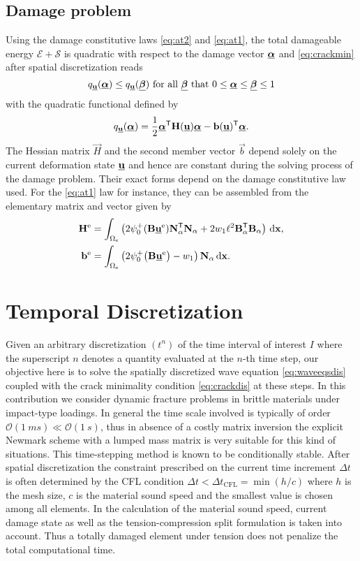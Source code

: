 \subsection{Damage problem}
Using the damage constitutive laws \eqref{eq:at2} and \eqref{eq:at1}, the total damageable energy $\mathcal{E}+\mathcal{S}$ is quadratic with respect to the damage vector $\dvec$ and \eqref{eq:crackmin} after spatial discretization reads 
\begin{equation} \label{eq:crackdis}
q_{\uvec}(\dvec)\leq q_{\uvec}(\underline{\vec{\beta}})\text{ for all $\underline{\vec{\beta}}$ that $0\leq\dvec\leq\underline{\vec{\beta}}\leq 1$}
\end{equation}
with the quadratic functional defined by
\begin{equation} \label{eq:Hb}
q_{\uvec}(\dvec)=\frac{1}{2}\dvec^\mT\vec{H}(\uvec)\dvec-\vec{b}(\uvec)^\mT\dvec.
\end{equation}
The Hessian matrix $\vec{H}$ and the second member vector $\vec{b}$ depend solely on the current deformation state $\uvec$ and hence are constant during the solving process of the damage problem. Their exact forms depend on the damage constitutive law used. For the \eqref{eq:at1} law for instance, they can be assembled from the elementary matrix and vector given by
\begin{align*}
\vec{H}^\me &= \int_{\Omega_\me}\left(2\psi_0^+(\vec{B}\uvec^\me)\vec{N}_\alpha^\mT\vec{N}_\alpha+2w_1\ell^2 \vec{B}_\alpha^\mT\vec{B}_\alpha\right)\dx, \\
\vec{b}^\me &= \int_{\Omega_\me}\left(2\psi_0^+\bigl(\vec{B}\uvec^\me\bigr)-w_1\right)\vec{N}_\alpha\dx.
\end{align*}

\section{Temporal Discretization} \label{sec:explicitnewmark}
Given an arbitrary discretization $(t^n)$ of the time interval of interest $I$ where the superscript $n$ denotes a quantity evaluated at the $n$-th time step, our objective here is to solve the spatially discretized wave equation \eqref{eq:waveeqsdis} coupled with the crack minimality condition \eqref{eq:crackdis} at these steps. In this contribution we consider dynamic fracture problems in brittle materials under impact-type loadings. In general the time scale involved is typically of order $\mathcal{O}(\SI{1}{ms})\ll\mathcal{O}(\SI{1}{s})$, thus in absence of a costly matrix inversion the explicit Newmark scheme with a lumped mass matrix is very suitable for this kind of situations. This time-stepping method is known to be conditionally stable. After spatial discretization the constraint prescribed on the current time increment $\Delta t$ is often determined by the CFL condition $\Delta t<\Delta t_\mathrm{CFL}=\min(h/c)$ where $h$ is the mesh size, $c$ is the material sound speed and the smallest value is chosen among all elements. In the calculation of the material sound speed, current damage state as well as the tension-compression split formulation is taken into account. Thus a totally damaged element under tension does not penalize the total computational time.

